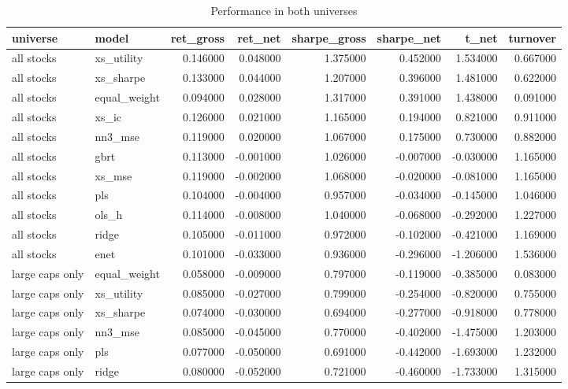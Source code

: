 \begin{table}
\caption{Performance in both universes}
\label{tab:t10_capacity_full}
\begin{tabular}{llrrrrrr}
\toprule
universe & model & ret\_gross & ret\_net & sharpe\_gross & sharpe\_net & t\_net & turnover \\
\midrule
all stocks & xs\_utility & 0.146000 & 0.048000 & 1.375000 & 0.452000 & 1.534000 & 0.667000 \\
all stocks & xs\_sharpe & 0.133000 & 0.044000 & 1.207000 & 0.396000 & 1.481000 & 0.622000 \\
all stocks & equal\_weight & 0.094000 & 0.028000 & 1.317000 & 0.391000 & 1.438000 & 0.091000 \\
all stocks & xs\_ic & 0.126000 & 0.021000 & 1.165000 & 0.194000 & 0.821000 & 0.911000 \\
all stocks & nn3\_mse & 0.119000 & 0.020000 & 1.067000 & 0.175000 & 0.730000 & 0.882000 \\
all stocks & gbrt & 0.113000 & -0.001000 & 1.026000 & -0.007000 & -0.030000 & 1.165000 \\
all stocks & xs\_mse & 0.119000 & -0.002000 & 1.068000 & -0.020000 & -0.081000 & 1.165000 \\
all stocks & pls & 0.104000 & -0.004000 & 0.957000 & -0.034000 & -0.145000 & 1.046000 \\
all stocks & ols\_h & 0.114000 & -0.008000 & 1.040000 & -0.068000 & -0.292000 & 1.227000 \\
all stocks & ridge & 0.105000 & -0.011000 & 0.972000 & -0.102000 & -0.421000 & 1.169000 \\
all stocks & enet & 0.101000 & -0.033000 & 0.936000 & -0.296000 & -1.206000 & 1.536000 \\
large caps only & equal\_weight & 0.058000 & -0.009000 & 0.797000 & -0.119000 & -0.385000 & 0.083000 \\
large caps only & xs\_utility & 0.085000 & -0.027000 & 0.799000 & -0.254000 & -0.820000 & 0.755000 \\
large caps only & xs\_sharpe & 0.074000 & -0.030000 & 0.694000 & -0.277000 & -0.918000 & 0.778000 \\
large caps only & nn3\_mse & 0.085000 & -0.045000 & 0.770000 & -0.402000 & -1.475000 & 1.203000 \\
large caps only & pls & 0.077000 & -0.050000 & 0.691000 & -0.442000 & -1.693000 & 1.232000 \\
large caps only & ridge & 0.080000 & -0.052000 & 0.721000 & -0.460000 & -1.733000 & 1.315000 \\

\end{tabular}
\end{table}
